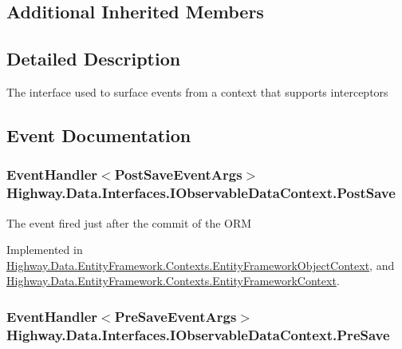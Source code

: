 \subsection*{Additional Inherited Members}


\subsection{Detailed Description}
The interface used to surface events from a context that supports interceptors 



\subsection{Event Documentation}
\hypertarget{interface_highway_1_1_data_1_1_interfaces_1_1_i_observable_data_context_a1978b914f7b94a37a6e86f3314326ca9}{
\subsubsection[{Post\-Save}]{\setlength{\rightskip}{0pt plus 5cm}Event\-Handler$<${\bf Post\-Save\-Event\-Args}$>$ Highway.\-Data.\-Interfaces.\-I\-Observable\-Data\-Context.\-Post\-Save}}\label{interface_highway_1_1_data_1_1_interfaces_1_1_i_observable_data_context_a1978b914f7b94a37a6e86f3314326ca9}


The event fired just after the commit of the O\-R\-M 



Implemented in \hyperlink{class_highway_1_1_data_1_1_entity_framework_1_1_contexts_1_1_entity_framework_object_context_ad5a527da395401a50839ae936576b9d9}{Highway.\-Data.\-Entity\-Framework.\-Contexts.\-Entity\-Framework\-Object\-Context}, and \hyperlink{class_highway_1_1_data_1_1_entity_framework_1_1_contexts_1_1_entity_framework_context_a2297153144a3e1240cb4526eb963b889}{Highway.\-Data.\-Entity\-Framework.\-Contexts.\-Entity\-Framework\-Context}.

\hypertarget{interface_highway_1_1_data_1_1_interfaces_1_1_i_observable_data_context_add85ecbc05ebf7174003841bdbd72dfe}{
\subsubsection[{Pre\-Save}]{\setlength{\rightskip}{0pt plus 5cm}Event\-Handler$<${\bf Pre\-Save\-Event\-Args}$>$ Highway.\-Data.\-Interfaces.\-I\-Observable\-Data\-Context.\-Pre\-Save}}\label{interface_highway_1_1_data_1_1_interfaces_1_1_i_observable_data_context_add85ecbc05ebf7174003841bdbd72dfe}


